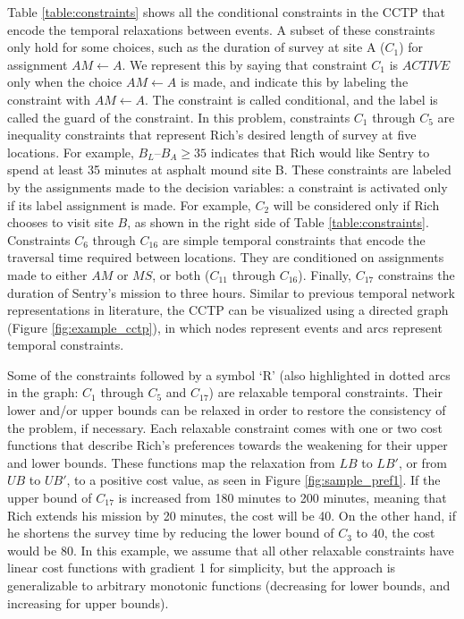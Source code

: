 \documentclass[jair,twoside,11pt,theapa]{article}
\begin{document}
%
%


Table \ref{table:constraints} shows all the conditional constraints in the CCTP
that encode the temporal relaxations between events. A subset of these constraints only hold for some choices, such as the duration of survey at site A ($C_1$) for assignment $AM\leftarrow A$. We represent this by saying that constraint $C_1$ is $ACTIVE$ only when the choice $AM\leftarrow A$ is made, and indicate this by labeling the constraint with $AM\leftarrow A$.  The constraint is called conditional, and the label is called the guard of the constraint. In this problem, constraints $C_1$ through
$C_5$ are inequality constraints that represent Rich's desired length of survey at
five locations. For example, $B_L$--$B_A\geq35$ indicates that Rich would like
Sentry to spend at least 35 minutes at asphalt mound site B. These constraints are labeled
by the assignments made to the decision variables: a constraint is activated
only if its label assignment is made. For example, $C_2$ will be considered only
if Rich chooses to visit site $B$, as shown in the right side of Table
\ref{table:constraints}. Constraints $C_6$ through $C_{16}$ are simple temporal
constraints that encode the traversal time required between locations. They are
conditioned on assignments made to either $AM$ or $MS$, or both ($C_{11}$
through $C_{16}$). Finally, $C_{17}$ constrains the duration of Sentry's mission
to three hours. Similar to previous temporal network representations in
literature, the CCTP can be visualized using a directed graph (Figure
\ref{fig:example_cctp}), in which nodes represent events and arcs represent temporal constraints.


Some of the constraints followed by a symbol `R' (also highlighted in dotted
arcs in the graph: $C_1$ through $C_5$ and $C_{17}$) are relaxable temporal
constraints. Their lower and/or upper bounds can be relaxed in order to restore
the consistency of the problem, if necessary. Each relaxable constraint comes
with one or two cost functions that describe Rich's preferences towards the
weakening for their upper and lower bounds. These functions map the relaxation
from $LB$ to $LB'$, or from $UB$ to $UB'$, to a positive cost value, as seen in
Figure \ref{fig:sample_pref1}. If the upper bound of $C_{17}$ is increased from
180 minutes to 200 minutes, meaning that Rich extends his mission by 20 minutes,
the cost will be 40. On the other hand, if he shortens the survey time by
reducing the lower bound of $C_3$ to 40, the cost would be 80. In this example,
we assume that all other relaxable constraints have linear cost functions with
gradient 1 for simplicity, but the approach is generalizable to arbitrary
monotonic functions (decreasing for lower bounds, and increasing for upper
bounds).
\end{document}
